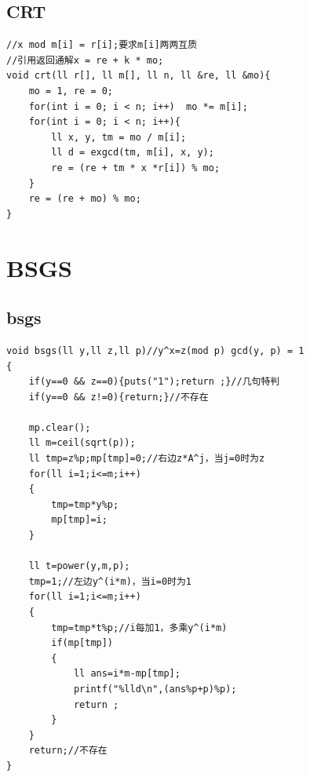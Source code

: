 \documentclass[twoside]{article}
\begin{document}
\subsection{CRT}
\begin{lstlisting}
//x mod m[i] = r[i];要求m[i]两两互质
//引用返回通解x = re + k * mo;
void crt(ll r[], ll m[], ll n, ll &re, ll &mo){
	mo = 1, re = 0;
	for(int i = 0; i < n; i++)	mo *= m[i];
	for(int i = 0; i < n; i++){
		ll x, y, tm = mo / m[i];
		ll d = exgcd(tm, m[i], x, y);
		re = (re + tm * x *r[i]) % mo;
	}
	re = (re + mo) % mo;
}\end{lstlisting}
\clearpage\section{BSGS}
\subsection{bsgs}
\begin{lstlisting}
void bsgs(ll y,ll z,ll p)//y^x=z(mod p) gcd(y, p) = 1
{
    if(y==0 && z==0){puts("1");return ;}//几句特判 
    if(y==0 && z!=0){return;}//不存在
    
    mp.clear();
    ll m=ceil(sqrt(p));
    ll tmp=z%p;mp[tmp]=0;//右边z*A^j，当j=0时为z 
    for(ll i=1;i<=m;i++)
    {
        tmp=tmp*y%p;
        mp[tmp]=i;
    }
    
    ll t=power(y,m,p); 
    tmp=1;//左边y^(i*m)，当i=0时为1
    for(ll i=1;i<=m;i++)
    {
        tmp=tmp*t%p;//i每加1，多乘y^(i*m)
        if(mp[tmp])
        {
            ll ans=i*m-mp[tmp];
            printf("%lld\n",(ans%p+p)%p);
            return ;
        }
    }
    return;//不存在
}\end{lstlisting}
\end{document}
